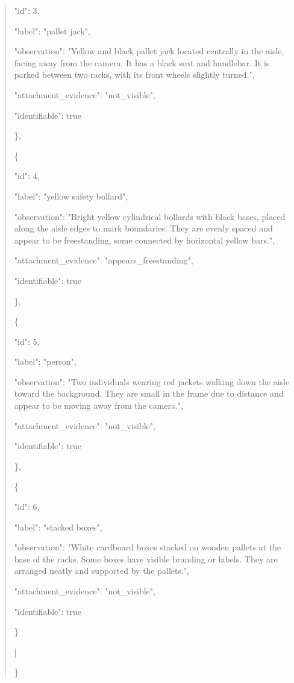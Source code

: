 \documentclass[10pt,a4paper]{article}
\begin{document}
\begin{quote}
      "id":\allowbreak{} 3,\allowbreak{}\par
      "label":\allowbreak{} "pallet jack",\allowbreak{}\par
      "observation":\allowbreak{} "Yellow and black pallet jack located centrally in the aisle,\allowbreak{} facing away from the camera. It has a black seat and handlebar. It is parked between two racks,\allowbreak{} with its front wheels slightly turned.",\allowbreak{}\par
      "attachment\_evidence":\allowbreak{} "not\_visible",\allowbreak{}\par
      "identifiable":\allowbreak{} true\par
    \},\allowbreak{}\par
    \{\par
      "id":\allowbreak{} 4,\allowbreak{}\par
      "label":\allowbreak{} "yellow safety bollard",\allowbreak{}\par
      "observation":\allowbreak{} "Bright yellow cylindrical bollards with black bases,\allowbreak{} placed along the aisle edges to mark boundaries. They are evenly spaced and appear to be freestanding,\allowbreak{} some connected by horizontal yellow bars.",\allowbreak{}\par
      "attachment\_evidence":\allowbreak{} "appears\_freestanding",\allowbreak{}\par
      "identifiable":\allowbreak{} true\par
    \},\allowbreak{}\par
    \{\par
      "id":\allowbreak{} 5,\allowbreak{}\par
      "label":\allowbreak{} "person",\allowbreak{}\par
      "observation":\allowbreak{} "Two individuals wearing red jackets walking down the aisle toward the background. They are small in the frame due to distance and appear to be moving away from the camera.",\allowbreak{}\par
      "attachment\_evidence":\allowbreak{} "not\_visible",\allowbreak{}\par
      "identifiable":\allowbreak{} true\par
    \},\allowbreak{}\par
    \{\par
      "id":\allowbreak{} 6,\allowbreak{}\par
      "label":\allowbreak{} "stacked boxes",\allowbreak{}\par
      "observation":\allowbreak{} "White cardboard boxes stacked on wooden pallets at the base of the racks. Some boxes have visible branding or labels. They are arranged neatly and supported by the pallets.",\allowbreak{}\par
      "attachment\_evidence":\allowbreak{} "not\_visible",\allowbreak{}\par
      "identifiable":\allowbreak{} true\par
    \}\par
  ]\par
\}
\end{quote}
\end{document}
